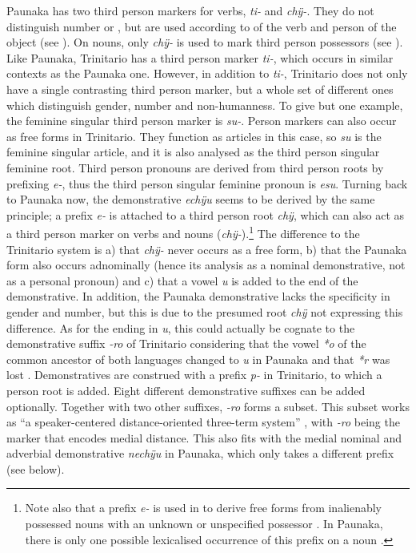 Paunaka has two third person markers for verbs, \textit{ti-} and \textit{chÿ-}. They do not distinguish number or , but are used according to  of the verb and person of the object (see ). On nouns, only \textit{chÿ-} is used to mark third person possessors (see ). Like Paunaka, Trinitario has a third person marker \textit{ti-}, which occurs in similar contexts as the Paunaka one. However, in addition to \textit{ti-}, Trinitario does not only have a single contrasting third person marker, but a whole set of different ones which distinguish gender, number and non-humanness. To give but one example, the feminine singular third person marker is \textit{su-}. Person markers can also occur as free forms in Trinitario. They function as articles in this case, so \textit{su} is the feminine singular article, and it is also analysed as the third person singular feminine root. Third person pronouns are derived from third person roots by prefixing \textit{e-}, thus the third person singular feminine pronoun is \textit{esu}. Turning back to Paunaka now, the demonstrative \textit{echÿu} seems to be derived by the same principle; a prefix \textit{e-} is attached to a third person root \textit{chÿ}, which can also act as a third person marker on verbs and nouns (\textit{chÿ-}).\footnote{Note also that a prefix \textit{e-} is used in  to derive free forms from inalienably possessed nouns with an unknown or unspecified possessor \citep[119]{Danielsen2007}. In Paunaka, there is only one possible lexicalised occurrence of this prefix on a noun \citep[244]{TerhartDanielsenBODY}.} The difference to the Trinitario system is a) that \textit{chÿ-} never occurs as a free form, b) that the Paunaka form also occurs adnominally (hence its analysis as a nominal demonstrative, not as a personal pronoun) and c) that a vowel \textit{u} is added to the end of the demonstrative. In addition, the Paunaka demonstrative lacks the specificity in gender and number, but this is due to the presumed root \textit{chÿ} not expressing this difference. As for the ending in \textit{u}, this could actually be cognate to the demonstrative suffix \textit{-ro} of Trinitario considering that the vowel \textit{*o} of the common ancestor of both languages changed to \textit{u} in Paunaka and that \textit{*r} was lost \citep[cf.][]{deCarvalhoPAU}. Demonstratives are construed with a prefix \textit{p-} in Trinitario, to which a person root is added. Eight different demonstrative suffixes can be added optionally. Together with two other suffixes, \textit{-ro} forms a subset. This subset works as “a speaker-centered distance-oriented three-term system” \citep[2]{Rose2017}, with \textit{-ro} being the marker that encodes medial distance. This also fits with the medial nominal and adverbial demonstrative \textit{nechÿu} in Paunaka, which only takes a different prefix (see below).

